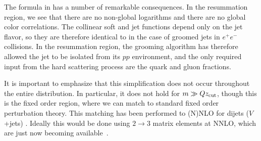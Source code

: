 The formula in  has a number of remarkable consequences.
%
In the resummation region, we see that there are no non-global logarithms and there are no global color correlations.
%
The collinear soft and jet functions depend only on the jet flavor, so they are therefore identical to in the case of groomed jets in $e^+e^-$ collisions.
%
In the resummation region, the grooming algorithm has therefore allowed the jet to be isolated from its $pp$ environment, and the only required input from the hard scattering process are the quark and gluon fractions. 

It is important to emphasize that this simplification does not occur throughout the entire distribution.
%
In particular, it does not hold for $m \gg Qz_{\rm cut}$, though this is the fixed order region, where we can match to standard fixed order perturbation theory.
%
This matching has been performed to (N)NLO for dijets ($V$+jets) \cite{Frye:2016aiz,Marzani:2017kqd,Marzani:2017mva}.
%
Ideally this would be done using $2\to 3$ matrix elements at NNLO, which are just now becoming available~\cite{Gehrmann:2015bfy,Dunbar:2016aux,Badger:2013yda,Badger:2017jhb,Abreu:2017hqn}.



%

%
%


